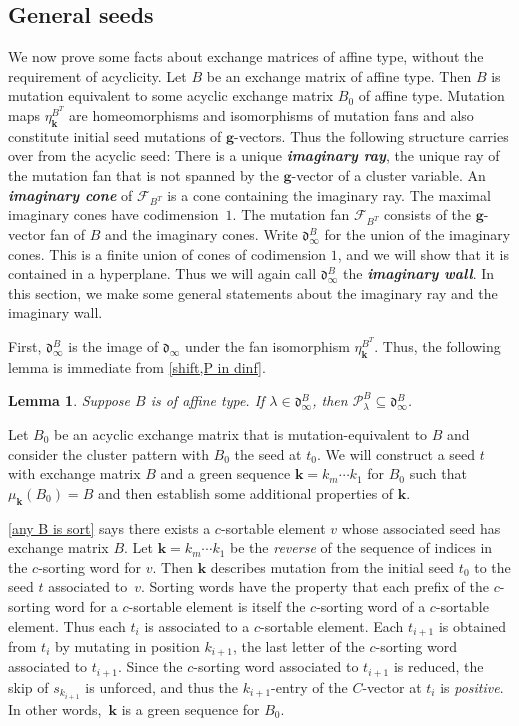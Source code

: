 \documentclass{amsart}
\newtheorem{lemma}[proposition]{Lemma}
\theoremstyle{definition}
\theoremstyle{remark}
\numberwithin{equation}{section}
\newcommand{\newword}[1]{\textbf{\emph{#1}}}
\newcommand{\F}{{\mathcal F}}
\newcommand{\0}{{\mathbf{0}}}
\newcommand{\g}{\mathbf{g}}
\newcommand{\kk}{\mathbf{k}}
\renewcommand{\P}{\mathcal{P}}
\renewcommand{\d}{{\mathfrak d}}
\begin{document}
\subsection{General seeds}
We now prove some facts about exchange matrices of affine type, without the requirement of acyclicity.
Let $B$ be an exchange matrix of affine type.
Then $B$ is mutation equivalent to some acyclic exchange matrix $B_0$ of affine type.
Mutation maps $\eta_\kk^{B^T}$ are homeomorphisms and isomorphisms of mutation fans and also constitute initial seed mutations of $\g$-vectors.
Thus the following structure carries over from the acyclic seed:
There is a unique \newword{imaginary ray}, the unique ray of the mutation fan that is not spanned by the $\g$-vector of a cluster variable.
An \newword{imaginary cone} of $\F_{B^T}$ is a cone containing the imaginary ray.
The maximal imaginary cones have codimension~$1$.
The mutation fan $\F_{B^T}$ consists of the $\g$-vector fan of $B$ and the imaginary cones.
Write $\d^B_\infty$ for the union of the imaginary cones.
This is a finite union of cones of codimension $1$, and we will show that it is contained in a hyperplane.
Thus we will again call $\d^B_\infty$ the \newword{imaginary wall}.
In this section, we make some general statements about the imaginary ray and the imaginary wall.

First, $\d^B_\infty$ is the image of $\d_\infty$ under the fan isomorphism $\eta_\kk^{B^T}$.
Thus, the following lemma is immediate from \cref{shift,P in dinf}.

\begin{lemma}\label{P in dBinf}
Suppose $B$ is of affine type.
If $\lambda\in\d^B_\infty$, then $\P^B_\lambda\subseteq\d^B_\infty$.
\end{lemma}

Let $B_0$ be an acyclic exchange matrix that is mutation-equivalent to $B$ and consider the cluster pattern with $B_0$ the seed at $t_0$.
We will construct a seed $t$ with exchange matrix $B$ and a green sequence $\kk=k_m\cdots k_1$ for $B_0$ such that $\mu_\kk(B_0)=B$ and then establish some additional properties of $\kk$.

\cref{any B is sort} says there exists a $c$-sortable element $v$ whose associated seed has exchange matrix $B$.
Let $\kk=k_m\cdots k_1$ be the \emph{reverse} of the sequence of indices in the $c$-sorting word for $v$.
Then $\kk$ describes mutation from the initial seed $t_0$ to the seed $t$ associated to~$v$.
Sorting words have the property that each prefix of the $c$-sorting word for a $c$-sortable element is itself the $c$-sorting word of a $c$-sortable element.
Thus each $t_i$ is associated to a $c$-sortable element.
Each $t_{i+1}$ is obtained from $t_i$ by mutating in position $k_{i+1}$, the last letter of the $c$-sorting word associated to $t_{i+1}$.
Since the $c$-sorting word associated to $t_{i+1}$ is reduced, the skip of $s_{k_{i+1}}$ is unforced, and thus the $k_{i+1}$-entry of the $C$-vector at $t_i$ is \emph{positive}.
In other words,~$\kk$ is a green sequence for $B_0$.
\end{document}
